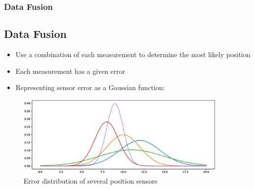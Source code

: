 \documentclass[10pt,serif,t]{beamer}
\newenvironment{SubSlide}[1]
{
  \begin{frame}[fragile,environment=SubSlide]
    \frametitle{#1}
    \subsection{#1}
  }
  {
  \end{frame}
}
\begin{document}
\begin{SubSlide}{Data Fusion}
  \begin{itemize}
    \item
      Use a combination of each measurement to determine the most likely
      position

    \item
      Each measurement has a given error

      \vspace{1em}

      \pause

    \item
      Representing sensor error as a Gaussian function:

  \end{itemize}

  \begin{figure}
    \centering
    \includegraphics[height=4cm]{graphics/gaussians.eps}
    \caption{Error distribution of several position sensors}
    \label{fig:VisualSFM_Demo}
  \end{figure}
\end{SubSlide}
\end{document}
